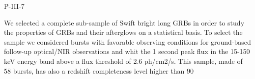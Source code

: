P-III-7


\bigskip



\bigskip

\noindent We selected a complete sub-sample of Swift bright long GRBs in order to study the properties of GRBs and their afterglows on a statistical basis. To select the sample we considered bursts with favorable observing conditions for ground-based follow-up optical/NIR observations and whit the 1 second peak flux in the 15-150 keV energy band above a flux threshold of 2.6 ph/cm2/s. This sample, made of 58 bursts, has also a redshift completeness level higher than 90%
